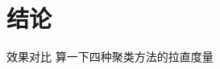 \section{结论}
\begin{frame}{效果对比}
    算一下四种聚类方法的拉直度量
\end{frame}

\begin{frame}[standout]
    
\end{frame}
